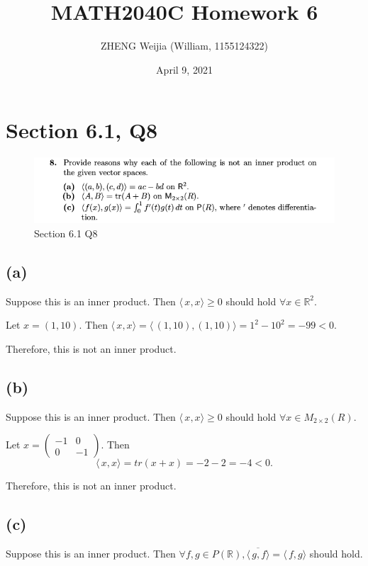 \documentclass[12pt]{article}%
\begin{document}
\title{MATH2040C Homework 6}
\author{ZHENG Weijia (William, 1155124322)}
\date{April 9, 2021}
\maketitle



\section{Section 6.1, Q8}

\begin{figure}[htp]
    \centering %
    \includegraphics[width = 16cm]{img/Q1.png}
    \caption{Section 6.1 Q8}
    \label{fig:figure1label}
\end{figure}

\subsection{(a)}
Suppose this is an inner product. Then $\langle\, x,x \rangle \geq 0$ should hold $\forall x \in \mathbb{R}^2.$

Let $x=(1,10).$ Then $\langle\, x,x \rangle=\langle\, (1,10),(1,10) \rangle=1^2-10^2=-99<0.$

Therefore, this is not an inner product.

\subsection{(b)}
Suppose this is an inner product. Then $\langle\, x,x \rangle \geq 0$ should hold $\forall x \in M_{2\times 2}(R).$

Let $x=\begin{pmatrix} -1&0\\0&-1\end{pmatrix}$. Then $$\langle\, x,x \rangle=tr(x+x)=-2-2=-4<0.$$

Therefore, this is not an inner product.

\subsection{(c)}
Suppose this is an inner product. Then $\forall f,g \in P(\mathbb{R}), \overline{\langle\, g,f \rangle}=\langle\, f,g \rangle$ should hold.
\end{document}
